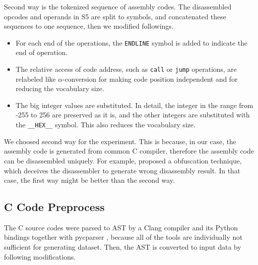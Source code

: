 \documentclass[senior,final,11pt]{iscs-thesis}
\begin{document}
Second way is the tokenized sequence of assembly codes. 
The disassembled opcodes and operands in S5 are split to symbols, and concatenated these sequences to one sequence, then we modified followings.
\begin{itemize}
\item For each end of the operations, the \texttt{ENDLINE} symbol is added to indicate the end of operation.
\item 
The relative access of code address, such as \texttt{call} or \texttt{jump} operations, 
are relabeled like $\alpha$-conversion for making code position independent and for reducing the vocabulary size.
\item The big integer values are substituted. 
In detail, the integer in the range from -255 to 256 are preserved as it is, and the other integers are substituted with the \texttt{\_\_HEX\_\_} symbol.
This also reduces the vocabulary size.
\end{itemize}

We choosed second way for the experiment.
This is because, in our case, the assembly code is generated from common C compiler, therefore the assembly code can be disassembled uniquely.
For example, \citet{disasm_obfuscate} proposed a obfuscation technique, which deceives the disassembler to generate wrong disassembly result.
In that case, the first way might be better than the second way.

\subsection{C Code Preprocess}
The C source codes were parsed to AST by a Clang compiler \citep{clang} and its Python bindings together with pycparser \citep{pycparser}, 
because all of the tools are individually not sufficient for generating dataset.
Then, the AST is converted to input data by following modifications.
\end{document}
